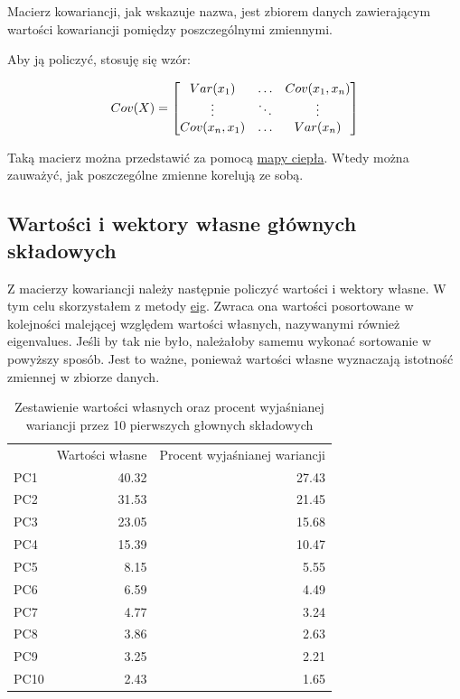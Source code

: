 \documentclass[12pt, a4paper]{article}
\begin{document}
        Macierz kowariancji, jak wskazuje nazwa, jest zbiorem danych zawierającym wartości kowariancji pomiędzy
        poszczególnymi zmiennymi.

        Aby ją policzyć, stosuję się wzór:

        \begin{equation}
            Cov(X) = \begin{bmatrix} Var(x_1) & \hdots & Cov(x_1, x_n)\\ \vdots & \ddots & \vdots\\ Cov(x_n, x_1) & \hdots & Var(x_n) \end{bmatrix}
        \end{equation}

        Taką macierz można przedstawić za pomocą \href{file:./graphics/cov.png}{mapy ciepła}. Wtedy można zauważyć,
        jak poszczególne zmienne korelują ze sobą.

    \subsection{Wartości i wektory własne głównych składowych}
        
        Z macierzy kowariancji należy następnie policzyć wartości i wektory własne. W tym celu skorzystałem z
        metody \href{https://numpy.org/doc/stable/reference/generated/numpy.linalg.eig.html}{eig}. Zwraca ona wartości posortowane w kolejności malejącej względem wartości własnych, nazywanymi również eigenvalues.
        Jeśli by tak nie było, należałoby samemu wykonać sortowanie w powyższy sposób. Jest to ważne, ponieważ wartości własne wyznaczają
        istotność zmiennej w zbiorze danych.

        \begin{table}
            \centering
            \caption{Zestawienie wartości własnych oraz procent wyjaśnianej wariancji przez 10 pierwszych głownych składowych}
            \begin{tabular}{lrr}
                & Wartości własne & Procent wyjaśnianej wariancji \\
                PC1 & 40.32 & 27.43 \\
                PC2 & 31.53 & 21.45 \\
                PC3 & 23.05 & 15.68 \\
                PC4 & 15.39 & 10.47 \\
                PC5 & 8.15 & 5.55 \\
                PC6 & 6.59 & 4.49 \\
                PC7 & 4.77 & 3.24 \\
                PC8 & 3.86 & 2.63 \\
                PC9 & 3.25 & 2.21 \\
                PC10 & 2.43 & 1.65 \\
            \end{tabular}
        \end{table}
\end{document}

